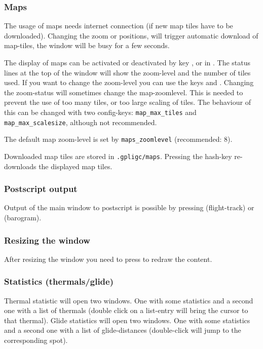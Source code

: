 \subsubsection{Maps}
The usage of maps needs internet connection (if new map tiles have to be downloaded).
Changing the zoom or positions, will trigger automatic download of map-tiles, the window will be busy for a few seconds.

The display of maps can be activated or deactivated by key , or in .
The status lines at the top of the window will show the zoom-level and the number of tiles used.
If you want to change the zoom-level you can use the keys \keys{{+}} and \keys{--}.
Changing the zoom-status will sometimes change the map-zoomlevel. This is needed to prevent
the use of too many tiles, or too large scaling of tiles.
The behaviour of this can be changed with two config-keys:
\texttt{map\_max\_tiles}
and \texttt{map\_max\_scalesize}, although not recommended.

The default map zoom-level is set by \texttt{maps\_zoomlevel} (recommended: 8).

Downloaded map tiles are stored in \texttt{.gpligc/maps}. Pressing the hash-key \keys{\#} re-downloads the displayed map tiles.


\subsubsection{Postscript output}
Output of the main window to postscript is possible by pressing  (flight-track)
or  (barogram).

\subsubsection{Resizing the window}
After resizing the window you need to press  to redraw the content.


\subsubsection{Statistics (thermals/glide)}
Thermal statistic  will open two windows. One with some statistics and a
second one with a list of thermals (double click on a list-entry will bring the cursor to that thermal).
Glide statistics  will open two windows. One with some statistics and a
second one with a list of glide-distances (double-click will jump to the corresponding spot).

